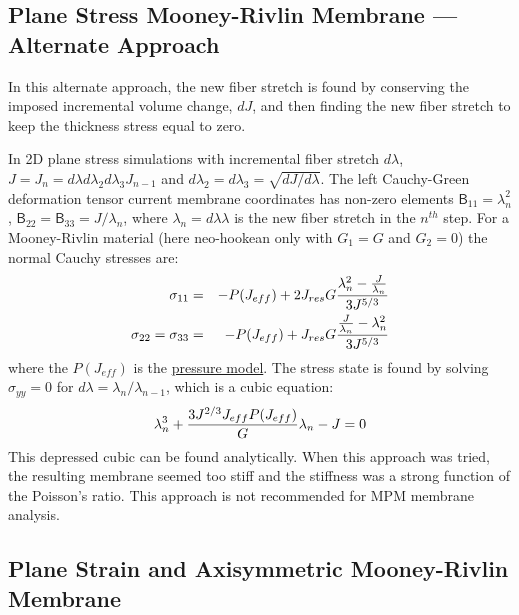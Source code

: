\documentclass[11pt]{book}
\newcommand{\tens}[1]{\boldsymbol{\mathsf{#1}}}
\def\Jeff{J_{eff}}
\def\Jres{J_{res}}
\begin{document}
\subsection{Plane Stress Mooney-Rivlin Membrane --- Alternate Approach}

In this alternate approach, the new fiber stretch is found by conserving the imposed incremental volume change, $dJ$, and then finding the new fiber stretch to keep the thickness stress equal to zero.

In 2D plane stress simulations with incremental fiber stretch $d\lambda$, $J = J_n=d\lambda d\lambda_2 d\lambda_3 J_{n-1}$ and $d\lambda_2=d\lambda_3 = \sqrt{dJ/d\lambda}$. The left Cauchy-Green deformation tensor current membrane coordinates has non-zero elements $\tens{B}_{11} = \lambda_n^2$, $\tens{B}_{22} = \tens{B}_{33}=J/\lambda_n$, where $\lambda_n = d\lambda\lambda$ is the new fiber stretch in the $n^{th}$ step. For a Mooney-Rivlin material (here neo-hookean only with $G_1=G$ and $G_2=0$) the normal Cauchy stresses are:
\begin{eqnarray}
      \sigma_{11} & = & -P(\Jeff) + 2\Jres G{\lambda_n^2-{J\over \lambda_n}\over 3J^{5/3}}  \\
      \sigma_{22} = \sigma_{33} & = & -P(\Jeff) +  \Jres G{{J\over \lambda_n}-\lambda_n^2\over 3J^{5/3}}
\end{eqnarray}
where the $P(\Jeff)$ is the \hyperref[PTerms]{pressure model}. The stress state is found by solving $\sigma_{yy}=0$ for $d\lambda=\lambda_n/\lambda_{n-1}$, which is a cubic equation:
\begin{equation}
	 \lambda_n^3+{3J^{2/3}\Jeff P(\Jeff)\over G} \lambda_n - J = 0
\end{equation}
This depressed cubic can be found analytically. When this approach was tried, the resulting membrane seemed too stiff and the stiffness was a strong function of the Poisson's ratio. This approach is not recommended for MPM membrane analysis.

\subsection{Plane Strain and Axisymmetric Mooney-Rivlin Membrane}
\end{document}
